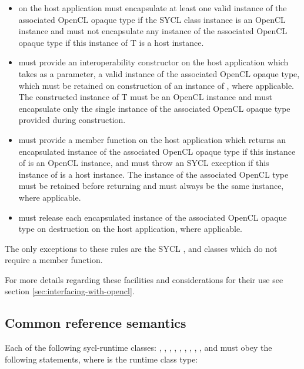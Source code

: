 \begin{itemize}

\item {} on the host application must encapsulate at least one valid instance of the associated OpenCL opaque type if the SYCL class instance is an OpenCL instance and must not encapsulate any instance of the associated OpenCL opaque type if this instance of T is a host instance.

\item {} must provide an interoperability constructor on the host application which takes as a parameter, a valid instance of the associated OpenCL opaque type, which must be retained on construction of an instance of , where applicable. The constructed instance of T must be an OpenCL instance and must encapsulate only the single instance of the associated OpenCL opaque type provided during construction.

\item {} must provide a  member function on the host application which returns an encapsulated instance of the associated OpenCL opaque type if this instance of  is an OpenCL instance, and must throw an  SYCL exception if this instance of  is a host instance. The instance of the associated OpenCL type must be retained before returning and must always be the same instance, where applicable.

\item {} must release each encapsulated instance of the associated OpenCL opaque type on destruction on the host application, where applicable.

\end{itemize}

The only exceptions to these rules are the SYCL ,  and  classes which do not require a  member function.

For more details regarding these facilities and considerations for their use see section \ref{sec:interfacing-with-opencl}.

\subsection{Common reference semantics}
\label{sec:reference-semantics}

Each of the following \gls{sycl-runtime} classes: , , , , , , , , ,  and  must obey the following statements, where  is the runtime class type:

